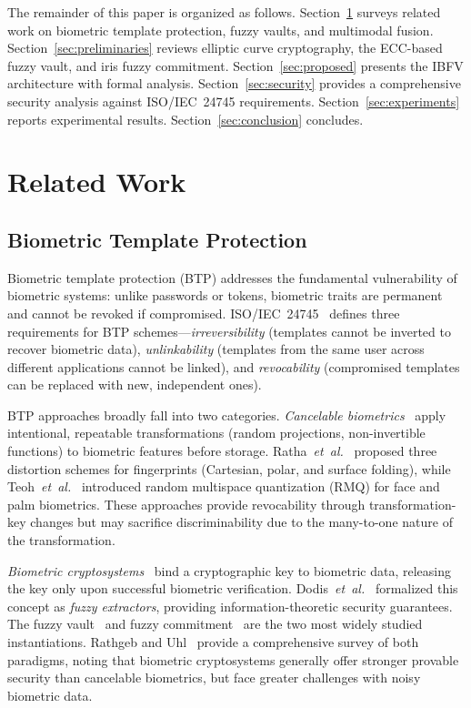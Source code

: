 \documentclass[3p,twocolumn]{elsarticle}
\newcommand{\IBFV}{\textsf{IBFV}}
\begin{document}
The remainder of this paper is organized as follows. Section~\ref{sec:related} surveys related work on biometric template protection, fuzzy vaults, and multimodal fusion. Section~\ref{sec:preliminaries} reviews elliptic curve cryptography, the ECC-based fuzzy vault, and iris fuzzy commitment. Section~\ref{sec:proposed} presents the \IBFV{} architecture with formal analysis. Section~\ref{sec:security} provides a comprehensive security analysis against ISO/IEC~24745 requirements. Section~\ref{sec:experiments} reports experimental results. Section~\ref{sec:conclusion} concludes.

\section{Related Work}
\label{sec:related}

\subsection{Biometric Template Protection}

Biometric template protection (BTP) addresses the fundamental vulnerability of biometric systems: unlike passwords or tokens, biometric traits are permanent and cannot be revoked if compromised. ISO/IEC~24745~\cite{iso24745} defines three requirements for BTP schemes---\emph{irreversibility} (templates cannot be inverted to recover biometric data), \emph{unlinkability} (templates from the same user across different applications cannot be linked), and \emph{revocability} (compromised templates can be replaced with new, independent ones).

BTP approaches broadly fall into two categories. \emph{Cancelable biometrics}~\cite{ratha2007generating} apply intentional, repeatable transformations (random projections, non-invertible functions) to biometric features before storage. Ratha~\textit{et~al.}~\cite{ratha2007generating} proposed three distortion schemes for fingerprints (Cartesian, polar, and surface folding), while Teoh~\textit{et~al.}~\cite{teoh2004random} introduced random multispace quantization (RMQ) for face and palm biometrics. These approaches provide revocability through transformation-key changes but may sacrifice discriminability due to the many-to-one nature of the transformation.

\emph{Biometric cryptosystems}~\cite{jain2008biometric} bind a cryptographic key to biometric data, releasing the key only upon successful biometric verification. Dodis~\textit{et~al.}~\cite{dodis2008fuzzy} formalized this concept as \emph{fuzzy extractors}, providing information-theoretic security guarantees. The fuzzy vault~\cite{juels2002fuzzy} and fuzzy commitment~\cite{hao2006combining} are the two most widely studied instantiations. Rathgeb and Uhl~\cite{rathgeb2011survey} provide a comprehensive survey of both paradigms, noting that biometric cryptosystems generally offer stronger provable security than cancelable biometrics, but face greater challenges with noisy biometric data.
\end{document}
